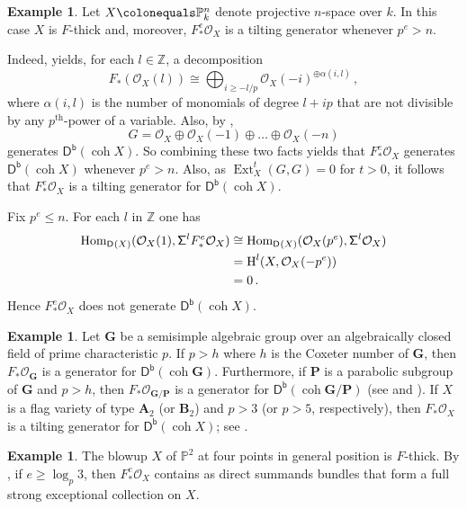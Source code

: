 \documentclass{amsart}
\renewenvironment{align*}{\linenomathNonumbers\oldalignstar}{\oldendalignstar\endlinenomath}
\newcommand{\dcat}[2][]{\cat{D}_{#1}(#2)}
\newcommand{\coh}{\operatorname{coh}}
\newcommand{\dbcat}[1]{\cat{D}^{\mathsf{b}}(#1)}
\newcommand{\mco}{\mathcal{O}}
\newcommand{\cat}[1]{{\mathsf{#1}}}
\newcommand{\Ext}{\operatorname{Ext}}
\newcommand{\hh}{\operatorname{H}}
\newcommand{\Hom}{\operatorname{Hom}}
\newcommand{\shift}{{\sf\Sigma}}
\theoremstyle{definition}
\newtheorem{example}[subsection]{Example}
\theoremstyle{remark}
\numberwithin{equation}{subsection}
\begin{document}
\begin{example}
\label{exm:F_thick_projective_space}
 Let $X\colonequals \mathbb{P}^n_k$ denote projective $n$-space over $k$. In this case $X$ is $F$-thick and, moreover, $F_*^e \mco_X$ is a tilting generator whenever $p^e>n.$ 
 
 Indeed, \cite[Lemma~2.1]{Rao:1999} yields, for each $l\in \mathbb{Z}$, a decomposition
 \[
F_* ( \mco_X(l)) \cong \bigoplus_{i\geq -l/p}\mco_X (-i)^{\oplus \alpha(i,l)}\,, 
 \]
 where $\alpha(i,l)$ is the number of monomials of degree $l+ip$ that are not divisible by any $p^{\text{th}}$-power of a variable. Also, by \cite{beil_collection}, 
 \[
 G=\mco_X\oplus\mco_X (-1)\oplus\ldots\oplus \mco_X(-n)
 \]
 generates $\dbcat{\coh X}$. So combining these two facts yields that $F_*^e \mco_X$ generates $\dbcat{\coh X}$ whenever $p^e > n$. Also, as $\Ext_X^t(G,G)=0$ for $t>0$, it follows that $F_*^e \mco_X$ is a tilting generator for $\dbcat{\coh X}$.
 
 Fix $p^e \leq n$. For each $l$ in $\mathbb{Z}$ one has
 \begin{align*}
 \Hom_{\dcat{X}} (\mco_X(1), \shift^lF_*^e\mco_X)
 &\cong \Hom_{\dcat{X}} (\mco_X(p^e), \shift^l\mco_X) \\
 &= \hh^l (X, \mco_X(-p^e)) \\
 & = 0\,.
 \end{align*}
 Hence $F_*^e \mco_X$ does not generate $\dbcat{\coh X}$. 
\end{example}
	
\begin{example}
\label{exm:F_thick_alg_group}
 Let $\mathbf{G}$ be a semisimple algebraic group over an algebraically closed field of prime characteristic $p$. If $p>h$ where $h$ is the Coxeter number of $\mathbf{G}$, then $F_* \mco_\mathbf{G}$ is a
 generator for $\dbcat{\coh{\mathbf{G}}}$. Furthermore, if
 $\mathbf{P}$ is a parabolic subgroup of $\mathbf{G}$ and $p>h$, then
 $F_* \mco_{\mathbf{G}/\mathbf{P}}$ is a generator
 for $\dbcat{\coh{\mathbf{G}/\mathbf{P}}}$ (see \cite{Bezrukavnikov/Mirkovic/Rumynin:2008} and \cite[Corollary 1.1]{tilting_frob}). If $X$ is a flag variety of type $\mathbf{A}_2$ (or
 $\mathbf{B}_2$) and $p>3$ (or $p>5$, respectively), then $F_* \mco_X$ is a
 tilting generator for $\dbcat{\coh{X}}$; see \cite[Corollary 3.2]{tilting_frob}.
\end{example}
	
\begin{example}
\label{exm:F_thick_hara_blowup}
 The blowup $X$ of $\mathbb{P}^2$ at four points in general position is $F$-thick. By \cite[Corollary~5.4 \& Proposition~6.4]{Hara:2015}, if $e \geq  \log_p 3$, then $F_*^e \mco_X$ contains as direct summands bundles that form a full strong exceptional collection on $X$.
\end{example}
	
\end{document}
